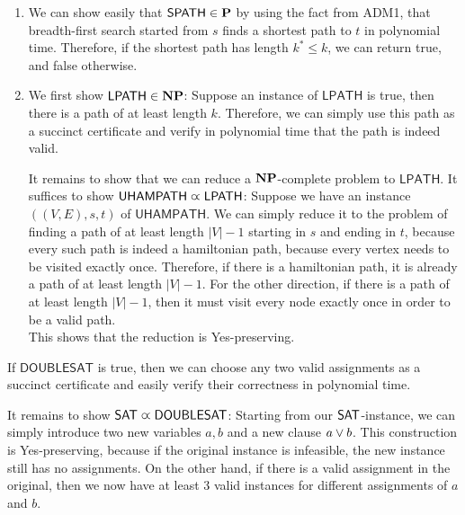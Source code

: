 \begin{aufgabe}
	\begin{enumerate}
		\item We can show easily that $\mathsf{SPATH} \in \mathbf{P}$ by using the fact from ADM1, that breadth-first search started from $s$
		      finds a shortest path to $t$ in polynomial time. Therefore, if the shortest path has length $k^* \leq k$, we can return true, and false otherwise.
		\item We first show $\mathsf{LPATH} \in \mathbf{NP}$: Suppose an instance of $\mathsf{LPATH}$ is true, then there is a path of at least length $k$.
		      Therefore, we can simply use this path as a succinct certificate and verify in polynomial time that the path is indeed valid.

		      It remains to show that we can reduce a $\mathbf{NP}$-complete problem to $\mathsf{LPATH}$.
		      It suffices to show $\mathsf{UHAMPATH} \varpropto \mathsf{LPATH}$: Suppose we have an instance $((V,E),s,t)$ of $\mathsf{UHAMPATH}$.
		      We can simply reduce it to the problem of finding a path of at least length $|V|-1$ starting in $s$ and ending in $t$, because
		      every such path is indeed a hamiltonian path, because every vertex needs to be visited exactly once.
		      Therefore, if there is a hamiltonian path, it is already a path of at least length $|V|-1$.
		      For the other direction, if there is a path of at least length $|V|-1$, then it must visit every node exactly once in order to be a valid path.\\
		      This shows that the reduction is Yes-preserving.
	\end{enumerate}
\end{aufgabe}
\begin{aufgabe}
	If $\mathsf{DOUBLESAT}$ is true, then we can choose any two valid assignments as a succinct certificate
	and easily verify their correctness in polynomial time.

	It remains to show $\mathsf{SAT} \varpropto \mathsf{DOUBLESAT}$: Starting from our $\mathsf{SAT}$-instance,
	we can simply introduce two new variables $a,b$ and a new clause $a \vee b$.
	This construction is Yes-preserving, because if the original instance is infeasible, the
	new instance still has no assignments. On the other hand, if there is a valid assignment in the original,
	then we now have at least 3 valid instances for different assignments of $a$ and $b$.
\end{aufgabe}
